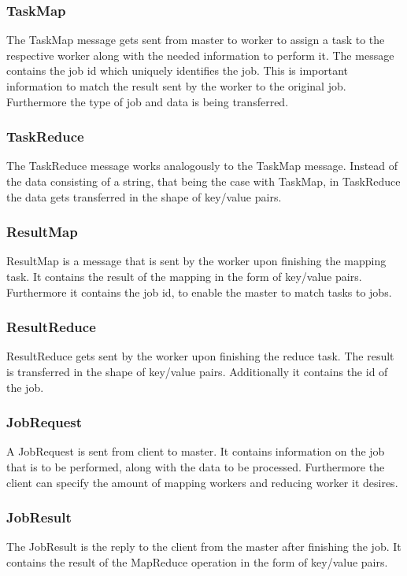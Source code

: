 \documentclass[12pt, letterpaper]{article}
\begin{document}
\subsubsection{TaskMap}
The TaskMap message gets sent from master to worker to assign a task to the respective worker along with the needed information to perform it. The message contains the job id which uniquely identifies the job. This is important information to match the result sent by the worker to the original job. Furthermore the type of job and data is being transferred.

\subsubsection{TaskReduce}
The TaskReduce message works analogously to the TaskMap message. Instead of the data consisting of a string, that being the case with TaskMap, in TaskReduce the data gets transferred in the shape of key/value pairs. 

\subsubsection{ResultMap}
ResultMap is a message that is sent by the worker upon finishing the mapping task. It contains the result of the mapping in the form of key/value pairs. Furthermore it contains the job id, to enable the master to match tasks to jobs.

\subsubsection{ResultReduce}
ResultReduce gets sent by the worker upon finishing the reduce task. The result is transferred in the shape of key/value pairs. Additionally it contains the id of the job. 

\subsubsection{JobRequest}
A JobRequest is sent from client to master. It contains information on the job that is to be performed, along with the data to be processed. Furthermore the client can specify the amount of mapping workers and reducing worker it desires. 

\subsubsection{JobResult}
The JobResult is the reply to the client from the master after finishing the job. It contains the result of the MapReduce operation in the form of key/value pairs.  
\end{document}
